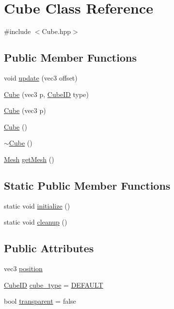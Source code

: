 \hypertarget{classCube}{}\section{Cube Class Reference}
\label{classCube}


{\ttfamily \#include $<$Cube.\+hpp$>$}

\subsection*{Public Member Functions}
\begin{DoxyCompactItemize}
\item 
void \mbox{\hyperlink{classCube_a038c53e0df559a029e9558a7f4b16e56}{update}} (vec3 offset)
\item 
\mbox{\hyperlink{classCube_a1609058c502ef5aa5d162809d156826b}{Cube}} (vec3 p, \mbox{\hyperlink{Cube_8hpp_ae2a13060ddab6f6437cc4d66a1f7c370}{Cube\+ID}} type)
\item 
\mbox{\hyperlink{classCube_a8ac9a092c5f71dd72671e83d406474aa}{Cube}} (vec3 p)
\item 
\mbox{\hyperlink{classCube_a06f3d86fb63e3aad08623610aa3c17b4}{Cube}} ()
\item 
\mbox{\hyperlink{classCube_aa814e979cecb8c451fdb332ded2cea1e}{$\sim$\+Cube}} ()
\item 
\mbox{\hyperlink{structMesh}{Mesh}} \mbox{\hyperlink{classCube_a16590bea0a2e21a9a068d9f17a5f9c59}{get\+Mesh}} ()
\end{DoxyCompactItemize}
\subsection*{Static Public Member Functions}
\begin{DoxyCompactItemize}
\item 
static void \mbox{\hyperlink{classCube_a612b349fc162d1c59dc8c45bcc33f93b}{initialize}} ()
\item 
static void \mbox{\hyperlink{classCube_aacf58e77463b0a26b81c141aa036af08}{cleanup}} ()
\end{DoxyCompactItemize}
\subsection*{Public Attributes}
\begin{DoxyCompactItemize}
\item 
vec3 \mbox{\hyperlink{classCube_a9b495ef759214f35fcc7f466ebfa64a9}{position}}
\item 
\mbox{\hyperlink{Cube_8hpp_ae2a13060ddab6f6437cc4d66a1f7c370}{Cube\+ID}} \mbox{\hyperlink{classCube_a4c15451eb6d1f99fd08f1f840aa8cec7}{cube\+\_\+type}} = \mbox{\hyperlink{Cube_8hpp_ae2a13060ddab6f6437cc4d66a1f7c370a88ec7d5086d2469ba843c7fcceade8a6}{D\+E\+F\+A\+U\+LT}}
\item 
bool \mbox{\hyperlink{classCube_ac7eda995b98581564cb8dbe3ccc9369d}{transparent}} = false
\end{DoxyCompactItemize}
